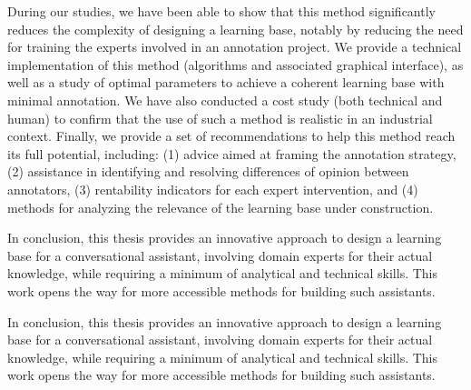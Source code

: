 \begin{ThesisAbstract}
\begin{EnglishAbstract}
		During our studies, we have been able to show that this method significantly reduces the complexity of designing a learning base, notably by reducing the need for training the experts involved in an annotation project.
		We provide a technical implementation of this method (algorithms and associated graphical interface), as well as a study of optimal parameters to achieve a coherent learning base with minimal annotation.
		We have also conducted a cost study (both technical and human) to confirm that the use of such a method is realistic in an industrial context.
		Finally, we provide a set of recommendations to help this method reach its full potential, including: (1) advice aimed at framing the annotation strategy, (2) assistance in identifying and resolving differences of opinion between annotators, (3) rentability indicators for each expert intervention, and (4) methods for analyzing the relevance of the learning base under construction.
		
		In conclusion, this thesis provides an innovative approach to design a learning base for a conversational assistant, involving domain experts for their actual knowledge, while requiring a minimum of analytical and technical skills.
		This work opens the way for more accessible methods for building such assistants.
		
		In conclusion, this thesis provides an innovative approach to design a learning base for a conversational assistant, involving domain experts for their actual knowledge, while requiring a minimum of analytical and technical skills.
		This work opens the way for more accessible methods for building such assistants.
		
	\end{EnglishAbstract}

\end{ThesisAbstract}